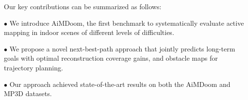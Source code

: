 Our key contributions can be summarized as follows:

$\bullet$ We introduce AiMDoom, the first benchmark to systematically evaluate active mapping in indoor scenes of different levels of difficulties.

$\bullet$ We propose a novel next-best-path approach that jointly predicts long-term goals with optimal reconstruction coverage gains, and obstacle maps for trajectory planning.


$\bullet$ Our approach achieved state-of-the-art results on both the AiMDoom and MP3D datasets.




